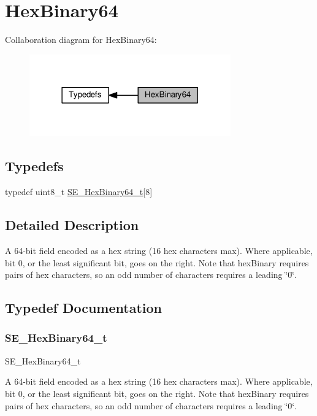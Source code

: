 \hypertarget{group__HexBinary64}{}\section{Hex\+Binary64}
\label{group__HexBinary64}
Collaboration diagram for Hex\+Binary64\+:\nopagebreak
\begin{figure}[H]
\begin{center}
\leavevmode
\includegraphics[width=246pt]{group__HexBinary64}
\end{center}
\end{figure}
\subsection*{Typedefs}
\begin{DoxyCompactItemize}
\item 
typedef uint8\+\_\+t \hyperlink{group__HexBinary64_ga718baff6d79d03afcdd37d53265c4684}{S\+E\+\_\+\+Hex\+Binary64\+\_\+t}\mbox{[}8\mbox{]}
\end{DoxyCompactItemize}


\subsection{Detailed Description}
A 64-\/bit field encoded as a hex string (16 hex characters max). Where applicable, bit 0, or the least significant bit, goes on the right. Note that hex\+Binary requires pairs of hex characters, so an odd number of characters requires a leading \char`\"{}0\char`\"{}. 

\subsection{Typedef Documentation}
\mbox{\label{group__HexBinary64_ga718baff6d79d03afcdd37d53265c4684}} 
\subsubsection{\texorpdfstring{S\+E\+\_\+\+Hex\+Binary64\+\_\+t}{SE\_HexBinary64\_t}}
{\footnotesize\ttfamily S\+E\+\_\+\+Hex\+Binary64\+\_\+t}

A 64-\/bit field encoded as a hex string (16 hex characters max). Where applicable, bit 0, or the least significant bit, goes on the right. Note that hex\+Binary requires pairs of hex characters, so an odd number of characters requires a leading \char`\"{}0\char`\"{}. 
